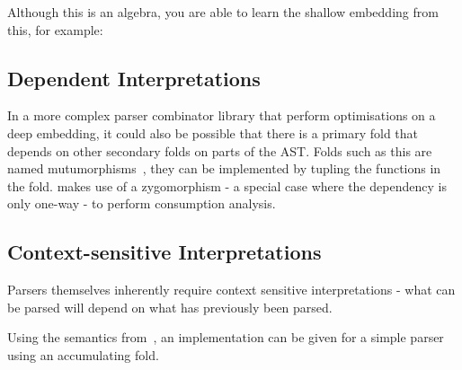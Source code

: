 \documentclass[a4paper, twocolumn, 10pt]{extarticle}
\newcommand\codeskip{\mskip\codemuskip}%
\let\codefont\textsf
\newcommand{\Conid}[1]{\mathit{#1}}
\newcommand{\Varid}[1]{\mathit{#1}}
\def\resethooks{%
  \global\let\SaveRestoreHook\empty
  \global\let\ColumnHook\empty}
\let\hspre\empty
\let\hspost\empty
\renewcommand\Varid[1]{\codefont{#1}}
\let\Conid\Varid
\begin{document}
Although this is an algebra, you are able to learn the shallow embedding from this, for example:

\resethooks

\subsection{Dependent Interpretations}

In a more complex parser combinator library that perform optimisations on a deep embedding,
it could also be possible that there is a primary fold that depends on other secondary folds on parts of the AST.
Folds such as this are named mutumorphisms~\cite{Fokkinga1989TuplingAM},
they can be implemented by tupling the functions in the fold.
\citet{parsley} makes use of a zygomorphism -
a special case where the dependency is only one-way - to perform consumption analysis.


\subsection{Context-sensitive Interpretations}


Parsers themselves inherently require context sensitive interpretations - what can be parsed will
depend on what has previously been parsed.

Using the semantics from~\citet{wuYoda}, an implementation can be given for a simple parser using an accumulating fold.
\end{document}
